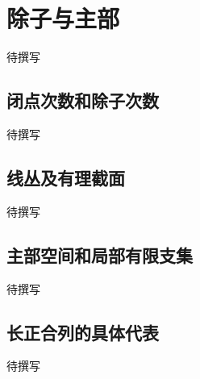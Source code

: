 
% 
% 

\section{除子与主部}
\label{g5:sec:2302}

待撰写

\subsection{闭点次数和除子次数}
\label{g5:subsec:2302:01}
待撰写

\subsection{线丛及有理截面}
\label{g5:subsec:2302:02}
待撰写

\subsection{主部空间和局部有限支集}
\label{g5:subsec:2302:03}
待撰写

\subsection{长正合列的具体代表}
\label{g5:subsec:2302:04}
待撰写
